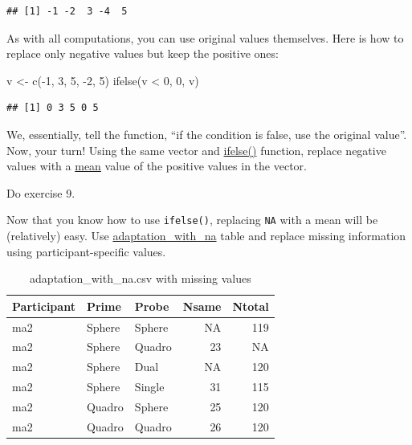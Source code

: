 \documentclass[
]{book}
\newenvironment{Shaded}{\begin{snugshade}}{\end{snugshade}}
\newcommand{\DecValTok}[1]{\textcolor[rgb]{0.00,0.00,0.81}{#1}}
\newcommand{\FunctionTok}[1]{\textcolor[rgb]{0.00,0.00,0.00}{#1}}
\newcommand{\NormalTok}[1]{#1}
\newcommand{\OtherTok}[1]{\textcolor[rgb]{0.56,0.35,0.01}{#1}}
\newcommand{\SpecialCharTok}[1]{\textcolor[rgb]{0.00,0.00,0.00}{#1}}
\begin{document}
\begin{verbatim}
## [1] -1 -2  3 -4  5
\end{verbatim}

As with all computations, you can use original values themselves. Here is how to replace only negative values but keep the positive ones:

\begin{Shaded}
\begin{Highlighting}[]
\NormalTok{v }\OtherTok{\textless{}{-}} \FunctionTok{c}\NormalTok{(}\SpecialCharTok{{-}}\DecValTok{1}\NormalTok{, }\DecValTok{3}\NormalTok{, }\DecValTok{5}\NormalTok{, }\SpecialCharTok{{-}}\DecValTok{2}\NormalTok{, }\DecValTok{5}\NormalTok{)}
\FunctionTok{ifelse}\NormalTok{(v }\SpecialCharTok{\textless{}} \DecValTok{0}\NormalTok{, }\DecValTok{0}\NormalTok{, v)}
\end{Highlighting}
\end{Shaded}

\begin{verbatim}
## [1] 0 3 5 0 5
\end{verbatim}

We, essentially, tell the function, ``if the condition is false, use the original value''. Now, your turn! Using the same vector and \href{https://stat.ethz.ch/R-manual/R-devel/library/base/html/ifelse.html}{ifelse()} function, replace negative values with a \href{https://stat.ethz.ch/R-manual/R-devel/library/base/html/mean.html}{mean} value of the positive values in the vector.

Do exercise 9.

Now that you know how to use \texttt{ifelse()}, replacing \texttt{NA} with a mean will be (relatively) easy. Use \href{data/adaptation_with_na.csv}{adaptation\_with\_na} table and replace missing information using participant-specific values.

\begin{table}

\caption{\label{tab:unnamed-chunk-290}adaptation\_with\_na.csv with missing values}
\centering
\begin{tabular}[t]{l|l|l|r|r}
\hline
Participant & Prime & Probe & Nsame & Ntotal\\
\hline
ma2 & Sphere & Sphere & NA & 119\\
\hline
ma2 & Sphere & Quadro & 23 & NA\\
\hline
ma2 & Sphere & Dual & NA & 120\\
\hline
ma2 & Sphere & Single & 31 & 115\\
\hline
ma2 & Quadro & Sphere & 25 & 120\\
\hline
ma2 & Quadro & Quadro & 26 & 120\\
\hline
\end{tabular}
\end{table}
\end{document}
